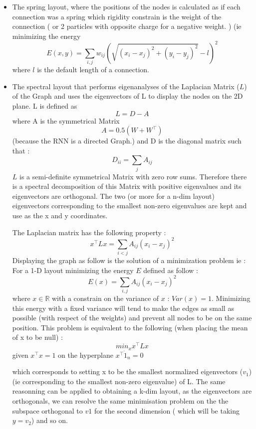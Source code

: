 \begin{itemize}
    \item The spring layout, where the positions of the nodes is calculated as if each connection was a spring which rigidity constrain is the weight of the connection ( or 2 particles with opposite charge for a negative weight. ) (ie minimizing the energy $$ E(x, y) = \sum_{i,j} w_{ij}(\sqrt{(x_i - x_j)^2 + (y_i - y_j)^2} - l)^2 $$ where $l$ is the default length of a connection. 
    \item The spectral layout \cite{koren2003spectral} that performs eigenanalyses of the Laplacian Matrix ($L$) of the Graph and uses the eigenvectors of L to display the nodes on the 2D plane. L is defined as $$ L = D - A $$ where A is the symmetrical Matrix $$ A = 0.5(W + W^\top) $$ (because the RNN is a directed Graph.) and D is the diagonal matrix such that :  $$ D_{ii} = \sum_j A_{ij} $$ 
        $L$ is a semi-definite symmetrical Matrix with zero row sums. Therefore there is a spectral decomposition of this Matrix with positive eigenvalues and its eigenvectors are orthogonal. The two (or more for a n-dim layout) eigenvectors corresponding to the smallest non-zero eigenvalues are kept and use as the x and y coordinates.  

        The Laplacian matrix has the following property : $$x^\top  L x = \sum_{i < j} A_{ij}(x_i - x_j)^2 $$
        Displaying the graph as follow is the solution of a minimization problem ie : For a 1-D layout minimizing the energy $E$ defined as follow : 
        $$ E(x) = \sum_{i,j} A_{ij} (x_i - x_j)^2 $$ where $x \in \mathbb{R} $ with a constrain on the variance of $x$ : $Var(x) = 1 $. 
        Minimizing this energy with a fixed variance will tend to make the edges as small as possible (with respect of the weights) and prevent all nodes to be on the same position. 
    This problem is equivalent to the following (when placing the mean of x to be null) : 
    $$ min_x x^\top L x $$
    given $ x^\top x = 1 $
    on the hyperplane $x^\top \dot 1_n = 0 $

    which corresponds to setting x to be the smallest normalized eigenvectors ($v_1$) (ie corresponding to the smallest non-zero eigenvalue) of L.
    The same reasonning can be applied to obtaining a k-dim layout, as the eigenvectors are orthogonals, we can resolve the same minimisation problem on the the subspace orthogonal to $v1$ for the second dimension ( which will be taking $y = v_2$) and so on. 
\end{itemize}


